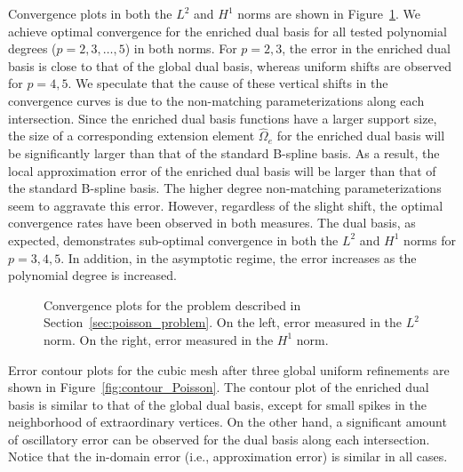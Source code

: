 Convergence plots in both the $L^2$ and $H^1$ norms are shown in Figure~\ref{fig:Poisson_convergence}. We achieve optimal convergence for the enriched dual basis for all tested polynomial degrees ($p=2,3,\ldots,5$) in both norms. For $p=2,3$, the error in the enriched dual basis is close to that of the global dual basis, whereas uniform shifts are observed for $p=4,5$. We speculate that the cause of these vertical shifts in the convergence curves is due to the non-matching parameterizations along each intersection. Since the enriched dual basis functions have a larger support size, the size of a corresponding extension element $\hat{\Omega}_e$ for the enriched dual basis will be significantly larger than that of the standard B-spline basis. As a result, the local approximation error of the enriched dual basis will be larger than that of the standard B-spline basis. The higher degree non-matching parameterizations seem to aggravate this error. However, regardless of the slight shift, the optimal convergence rates have been observed in both measures. The \Bezier dual basis, as expected, demonstrates sub-optimal convergence in both the $L^2$ and $H^1$ norms for $p=3,4,5$. In addition, in the asymptotic regime, the error increases as the polynomial degree is increased.\par

\begin{figure}[ht]
	\center
	\captionsetup[subfigure]{labelformat=empty}
	\begin{subfigure}{.45\linewidth}
		\center
		
	\end{subfigure}\hspace{2mm}
	\begin{subfigure}{.45\linewidth}
		\center
		
	\end{subfigure}
	\caption{Convergence plots for the problem described in Section~\ref{sec:poisson_problem}. On the left, error measured in the $L^2$ norm. On the right, error measured in the $H^1$ norm.}\label{fig:Poisson_convergence}
\end{figure}

Error contour plots for the cubic mesh after three global uniform refinements are shown in Figure~\ref{fig:contour_Poisson}. The contour plot of the enriched dual basis is similar to that of the global dual basis, except for small spikes in the neighborhood of extraordinary vertices. On the other hand, a significant amount of oscillatory error can be observed for the \Bezier dual basis along each intersection. Notice that the in-domain error (i.e., approximation error) is similar in all cases.

